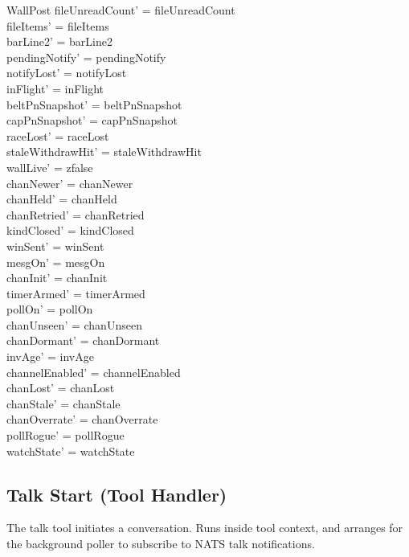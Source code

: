 \documentclass[a4paper,10pt,fleqn]{article}
\begin{document}
\begin{schema}{WallPost}
  fileUnreadCount' = fileUnreadCount \\
  fileItems' = fileItems \\
  barLine2' = barLine2 \\
  pendingNotify' = pendingNotify \\
  notifyLost' = notifyLost \\
  inFlight' = inFlight \\
  beltPnSnapshot' = beltPnSnapshot \\
  capPnSnapshot' = capPnSnapshot \\
  raceLost' = raceLost \\
  staleWithdrawHit' = staleWithdrawHit \\
  wallLive' = zfalse \\
  chanNewer' = chanNewer \\
  chanHeld' = chanHeld \\
  chanRetried' = chanRetried \\
  kindClosed' = kindClosed \\
  winSent' = winSent \\
  mesgOn' = mesgOn \\
  chanInit' = chanInit \\
  timerArmed' = timerArmed \\
  pollOn' = pollOn \\
  chanUnseen' = chanUnseen \\
  chanDormant' = chanDormant \\
  invAge' = invAge \\
  channelEnabled' = channelEnabled \\
  chanLost' = chanLost \\
  chanStale' = chanStale \\
  chanOverrate' = chanOverrate \\
  pollRogue' = pollRogue \\
  watchState' = watchState
\end{schema}

\subsection{Talk Start (Tool Handler)}

The talk tool initiates a conversation.  Runs inside tool context,
and arranges for the background poller to subscribe to NATS talk
notifications.
\end{document}
